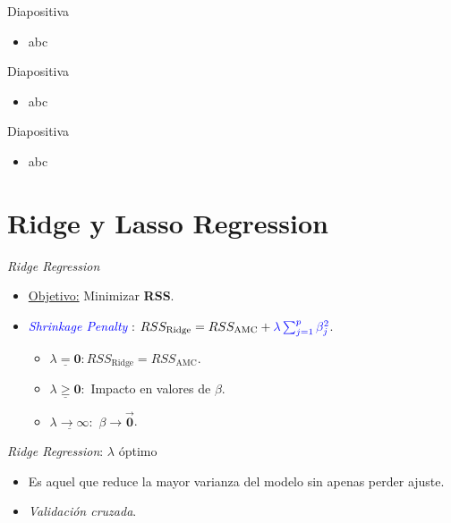 \documentclass[11pt]{beamer}
\newcommand{\B}{\beta}
\begin{document}
\begin{frame}{Diapositiva}
	\begin{itemize}
		\item abc
	\end{itemize}
\end{frame}

\begin{frame}{Diapositiva}
	\begin{itemize}
		\item abc
	\end{itemize}
\end{frame}

\begin{frame}{Diapositiva}
	\begin{itemize}
		\item abc
	\end{itemize}
\end{frame}


\section{Ridge y Lasso Regression}

\begin{frame}{\textit{Ridge Regression}}
	\begin{itemize}
		\item \underline{Objetivo:} Minimizar \textbf{RSS}.
		\item \textcolor{blue}{\textit{Shrinkage Penalty}} : $RSS_{\text{Ridge}} = RSS_{\text{AMC}} + \textcolor{blue}{\lambda \sum^p_{j=1} \beta_j^2}$.
		\begin{itemize}
			\item $\underline{\lambda = \mathbf{0}}: RSS_{\text{Ridge}} = RSS_{\text{AMC}}$.
			\item $\underline{\lambda \geq \mathbf{0}}:$ Impacto en valores de $\B$.
			\item $\underline{\lambda \to \mathbf{\infty}}:$ $\B \to \vec{\mathbf{0}}$.
		\end{itemize}
	\end{itemize}
\end{frame}

\begin{frame}{\textit{Ridge Regression}: $\lambda$ óptimo}
	\begin{itemize}
		\item Es aquel que reduce la mayor varianza del modelo sin apenas perder ajuste.
		\item \textit{Validación cruzada}.
	\end{itemize}
\end{frame}
\end{document}
